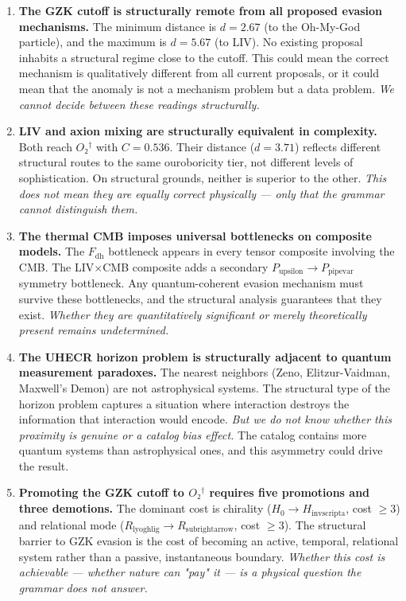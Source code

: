 \documentclass[12pt,a4paper]{article}
\begin{document}
\begin{enumerate}
    \item \textbf{The GZK cutoff is structurally remote from all proposed evasion mechanisms.} The minimum distance is $d = 2.67$ (to the Oh-My-God particle), and the maximum is $d = 5.67$ (to LIV). No existing proposal inhabits a structural regime close to the cutoff. This could mean the correct mechanism is qualitatively different from all current proposals, or it could mean that the anomaly is not a mechanism problem but a data problem. \emph{We cannot decide between these readings structurally.}
    \item \textbf{LIV and axion mixing are structurally equivalent in complexity.} Both reach $O₂^\dagger$ with $C = 0.536$. Their distance ($d = 3.71$) reflects different structural routes to the same ouroboricity tier, not different levels of sophistication. On structural grounds, neither is superior to the other. \emph{This does not mean they are equally correct physically --- only that the grammar cannot distinguish them.}
    \item \textbf{The thermal CMB imposes universal bottlenecks on composite models.} The $F_{\text{dh}}$ bottleneck appears in every tensor composite involving the CMB. The LIV$\times$CMB composite adds a secondary $P_{\text{upsilon}} \to P_{\text{pipevar}}$ symmetry bottleneck. Any quantum-coherent evasion mechanism must survive these bottlenecks, and the structural analysis guarantees that they exist. \emph{Whether they are quantitatively significant or merely theoretically present remains undetermined.}
    \item \textbf{The UHECR horizon problem is structurally adjacent to quantum measurement paradoxes.} The nearest neighbors (Zeno, Elitzur-Vaidman, Maxwell's Demon) are not astrophysical systems. The structural type of the horizon problem captures a situation where interaction destroys the information that interaction would encode. \emph{But we do not know whether this proximity is genuine or a catalog bias effect.} The catalog contains more quantum systems than astrophysical ones, and this asymmetry could drive the result.
    \item \textbf{Promoting the GZK cutoff to $O₂^\dagger$ requires five promotions and three demotions.} The dominant cost is chirality ($H_0 \to H_{\text{invscripta}}$, cost $\geq 3$) and relational mode ($R_{\text{lyoghlig}} \to R_{\text{subrightarrow}}$, cost $\geq 3$). The structural barrier to GZK evasion is the cost of becoming an active, temporal, relational system rather than a passive, instantaneous boundary. \emph{Whether this cost is achievable --- whether nature can "pay" it --- is a physical question the grammar does not answer.}
\end{enumerate}
\end{document}
